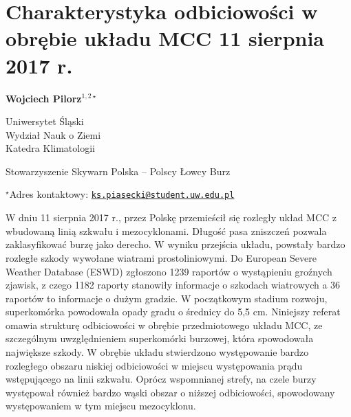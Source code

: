 \documentclass[\main/boa.tex]{subfiles}
\begin{document}
\section{Charakterystyka odbiciowości w obrębie układu MCC 11 sierpnia 2017 r.}

\begin{center}
  {\bf {} Wojciech Pilorz$^{1,2\star}$}
\end{center}

\vskip 0.3cm

\begin{affiliations}
\begin{enumerate}
\begin{minipage}{0.915\textwidth}
\centering
\item Uniwersytet Śląski\\Wydział Nauk o Ziemi\\ Katedra Klimatologii\\[-2pt]
\item Stowarzyszenie Skywarn Polska – Polscy Łowcy Burz\\[-2pt]
\end{minipage}
\end{enumerate}
$^\star$Adres kontaktowy: \href{mailto:ks.piasecki@student.uw.edu.pl}{\nolinkurl{ks.piasecki@student.uw.edu.pl}}\\
\end{affiliations}

\vskip 0.5cm


\vskip 0.5cm

W dniu 11 sierpnia 2017 r., przez Polskę przemieścił się rozległy układ MCC z wbudowaną linią szkwału i mezocyklonami. Długość pasa zniszczeń pozwala zaklasyfikować burzę jako derecho. W wyniku przejścia układu, powstały bardzo rozległe szkody wywołane wiatrami prostoliniowymi. Do European Severe Weather Database (ESWD) zgłoszono 1239 raportów o wystąpieniu groźnych zjawisk, z czego 1182 raporty stanowiły informacje o szkodach wiatrowych a 36 raportów to informacje o dużym gradzie. W początkowym stadium rozwoju, superkomórka powodowała opady gradu o średnicy do 5,5 cm. Niniejszy referat omawia strukturę odbiciowości w obrębie przedmiotowego układu MCC, ze szczególnym uwzględnieniem superkomórki burzowej, która spowodowała największe szkody. W obrębie układu stwierdzono występowanie bardzo rozległego obszaru niskiej odbiciowości w miejscu występowania prądu wstępującego na linii szkwału. Oprócz wspomnianej strefy, na czele burzy występował również bardzo wąski obszar o niższej odbiciowości, spowodowany występowaniem w tym miejscu mezocyklonu.
\end{document}
